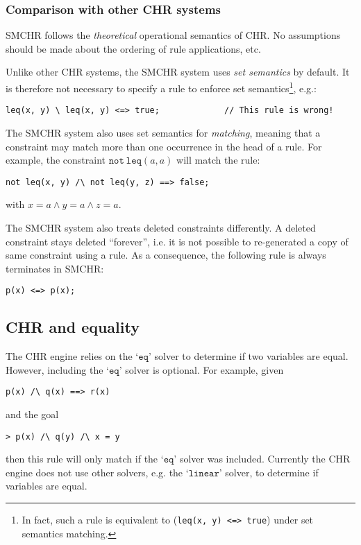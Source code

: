 \documentclass{article}
\begin{document}
\subsubsection*{Comparison with other CHR systems}

SMCHR follows the \emph{theoretical} operational semantics of CHR.
No assumptions should be made about the ordering of rule applications, etc.

Unlike other CHR systems, the SMCHR system uses \emph{set semantics} by
default.
It is therefore not necessary to specify a rule to enforce set
semantics\footnote{
In fact, such a rule is equivalent to (\texttt{leq(x, y) <=> true}) under
set semantics matching.}, e.g.:
\begin{verbatim}
leq(x, y) \ leq(x, y) <=> true;             // This rule is wrong!
\end{verbatim}
The SMCHR system also uses set semantics for \emph{matching}, meaning that
a constraint may match more than one occurrence in the head of a rule.
For example, the constraint $\mathtt{not}~\mathtt{leq}(a, a)$ will match
the rule:
\begin{verbatim}
not leq(x, y) /\ not leq(y, z) ==> false;
\end{verbatim}
with $x = a \wedge y = a \wedge z = a$.

The SMCHR system also treats deleted constraints differently.
A deleted constraint stays deleted ``forever'', i.e. it is not possible to
re-generated a copy of same constraint using a rule.
As a consequence, the following rule is always terminates in SMCHR:
\begin{verbatim}
p(x) <=> p(x);
\end{verbatim}

\subsection{CHR and equality}

The CHR engine relies on the `$\mathtt{eq}$' solver to determine if two
variables are equal.
However, including the `$\mathtt{eq}$' solver is optional.
For example, given
\begin{verbatim}
p(x) /\ q(x) ==> r(x)
\end{verbatim}
and the goal
\begin{verbatim}
> p(x) /\ q(y) /\ x = y
\end{verbatim}
then this rule will only match if the `$\mathtt{eq}$' solver was included.
Currently the CHR engine does not use other solvers, e.g. the
`$\mathtt{linear}$' solver, to determine if variables are equal.
\end{document}
